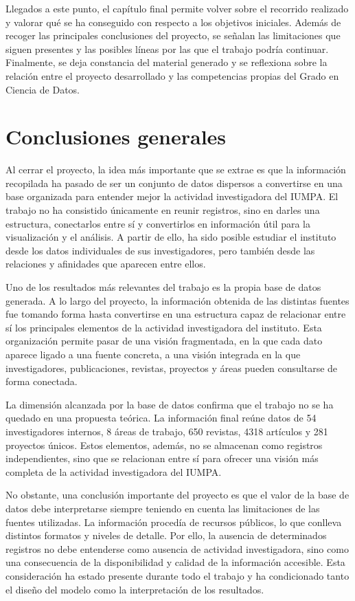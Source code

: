 \documentclass[11pt,spanish,listoffigures,listoftables]{tfgetsinf}
\begin{document}
Llegados a este punto, el capítulo final permite volver sobre el recorrido realizado y valorar qué se ha conseguido con respecto a los objetivos iniciales. Además de recoger las principales conclusiones del proyecto, se señalan las limitaciones que siguen presentes y las posibles líneas por las que el trabajo podría continuar. Finalmente, se deja constancia del material generado y se reflexiona sobre la relación entre el proyecto desarrollado y las competencias propias del Grado en Ciencia de Datos.

\section{Conclusiones generales}

Al cerrar el proyecto, la idea más importante que se extrae es que la información recopilada ha pasado de ser un conjunto de datos dispersos a convertirse en una base organizada para entender mejor la actividad investigadora del IUMPA. El trabajo no ha consistido únicamente en reunir registros, sino en darles una estructura, conectarlos entre sí y convertirlos en información útil para la visualización y el análisis. A partir de ello, ha sido posible estudiar el instituto desde los datos individuales de sus investigadores, pero también desde las relaciones y afinidades que aparecen entre ellos.

Uno de los resultados más relevantes del trabajo es la propia base de datos generada. A lo largo del proyecto, la información obtenida de las distintas fuentes fue tomando forma hasta convertirse en una estructura capaz de relacionar entre sí los principales elementos de la actividad investigadora del instituto. Esta organización permite pasar de una visión fragmentada, en la que cada dato aparece ligado a una fuente concreta, a una visión integrada en la que investigadores, publicaciones, revistas, proyectos y áreas pueden consultarse de forma conectada.

La dimensión alcanzada por la base de datos confirma que el trabajo no se ha quedado en una propuesta teórica. La información final reúne datos de 54 investigadores internos, 8 áreas de trabajo, 650 revistas, 4318 artículos y 281 proyectos únicos. Estos elementos, además, no se almacenan como registros independientes, sino que se relacionan entre sí para ofrecer una visión más completa de la actividad investigadora del IUMPA.

No obstante, una conclusión importante del proyecto es que el valor de la base de datos debe interpretarse siempre teniendo en cuenta las limitaciones de las fuentes utilizadas. La información procedía de recursos públicos, lo que conlleva distintos formatos y niveles de detalle. Por ello, la ausencia de determinados registros no debe entenderse como ausencia de actividad investigadora, sino como una consecuencia de la disponibilidad y calidad de la información accesible. Esta consideración ha estado presente durante todo el trabajo y ha condicionado tanto el diseño del modelo como la interpretación de los resultados.
\end{document}
